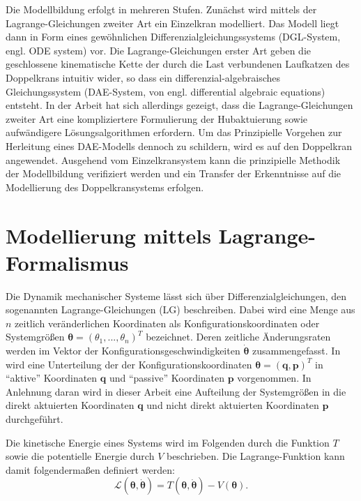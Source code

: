 Die Modellbildung erfolgt in mehreren Stufen. Zunächst wird mittels der Lagrange-Gleichungen zweiter Art ein Einzelkran modelliert. Das Modell liegt dann in Form eines gewöhnlichen Differenzialgleichungssystems (DGL-System, engl. ODE system) vor. Die Lagrange-Gleichungen erster Art geben die geschlossene kinematische Kette der durch die Last verbundenen Laufkatzen des Doppelkrans intuitiv wider, so dass ein differenzial-algebraisches Gleichungssystem (DAE-System, von engl. differential algebraic equations) entsteht. In der Arbeit hat sich allerdings gezeigt, dass die Lagrange-Gleichungen zweiter Art eine kompliziertere Formulierung der Hubaktuierung sowie aufwändigere Lösungsalgorithmen erfordern. Um das Prinzipielle Vorgehen zur Herleitung eines DAE-Modells dennoch zu schildern, wird es auf den Doppelkran angewendet. Ausgehend vom Einzelkransystem kann die prinzipielle Methodik der Modellbildung verifiziert werden und ein Transfer der Erkenntnisse auf die Modellierung des Doppelkransystems erfolgen.

\section{Modellierung mittels Lagrange-Formalismus}
Die Dynamik mechanischer Systeme lässt sich über Differenzialgleichungen, den sogenannten Lagrange-Gleichungen (LG) beschreiben. Dabei wird eine Menge aus $n$ zeitlich veränderlichen Koordinaten als Konfigurationskoordinaten oder Systemgrößen $\boldsymbol{\theta} = (\theta_1, ..., \theta_n)^T$ bezeichnet. Deren zeitliche Änderungsraten werden im Vektor der Konfigurationsgeschwindigkeiten $\dot{\boldsymbol{\theta}}$ zusammengefasst. In \cite[S.10]{DissKnoll} wird eine Unterteilung der der Konfigurationskoordinaten $\boldsymbol{\theta} = (\mathbf{q}, \mathbf{p})^T$ in ``aktive'' Koordinaten $\mathbf{q}$ und ``passive'' Koordinaten $\mathbf{p}$ vorgenommen. In Anlehnung daran wird in dieser Arbeit eine Aufteilung der Systemgrößen in die direkt aktuierten Koordinaten $\mathbf{q}$ und nicht direkt aktuierten Koordinaten $\mathbf{p}$ durchgeführt. \cite[S.7]{DissKnoll} 

Die kinetische Energie eines Systems wird im Folgenden durch die Funktion $T$ sowie die potentielle Energie durch $V$ beschrieben. Die Lagrange-Funktion kann damit folgendermaßen definiert werden:
\begin{equation}
\mathcal{L}(\boldsymbol{\theta}, \dot{\boldsymbol{\theta}}) = T(\boldsymbol{\theta}, \dot{\boldsymbol{\theta}}) - V(\boldsymbol{\theta}).
\end{equation}

